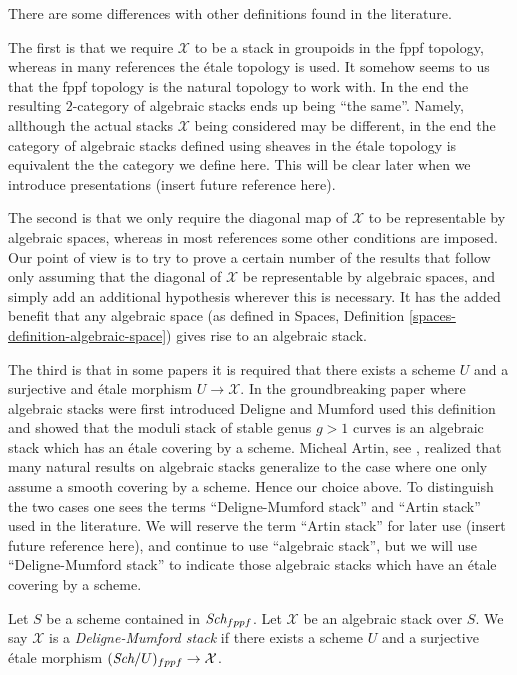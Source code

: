 \noindent
There are some differences with other definitions found in the literature.

\medskip\noindent
The first is that we require $\mathcal{X}$ to be a stack in groupoids
in the fppf topology, whereas in many references the \'etale topology is
used. It somehow seems to us that the fppf topology is the natural topology
to work with. In the end the resulting $2$-category of algebraic stacks
ends up being ``the same''. Namely, allthough the actual
stacks $\mathcal{X}$ being considered may be different, in the end the
category of algebraic stacks defined using sheaves in the \'etale topology
is equivalent the the category we define here. This will be clear later
when we introduce presentations (insert future reference here).

\medskip\noindent
The second is that we only require the diagonal map of $\mathcal{X}$ to be
representable by algebraic spaces, whereas in most references some other
conditions are imposed. Our point of view is to try to prove a certain
number of the results that follow only assuming that the diagonal
of $\mathcal{X}$ be representable by algebraic spaces, and simply add
an additional hypothesis wherever this is necessary. It has the added
benefit that any algebraic space (as defined in
Spaces, Definition \ref{spaces-definition-algebraic-space})
gives rise to an algebraic stack.

\medskip\noindent
The third is that in some papers it is required that there exists a
scheme $U$ and a surjective and \'etale morphism $U \to \mathcal{X}$.
In the groundbreaking paper \cite{DM} where algebraic stacks were first
introduced Deligne and Mumford used this definition and showed that
the moduli stack of stable genus $g > 1$ curves is an algebraic stack 
which has an \'etale covering by a scheme. Micheal Artin, see
\cite{artin_versal}, realized that many
natural results on algebraic stacks generalize to the case where one
only assume a smooth covering by a scheme. Hence our choice above.
To distinguish the two cases one sees the terms ``Deligne-Mumford stack''
and ``Artin stack'' used in the literature. We will reserve the term
``Artin stack'' for later use (insert future reference here), and continue
to use ``algebraic stack'', but we will use ``Deligne-Mumford stack''
to indicate those algebraic stacks which have an \'etale covering by a
scheme.

\begin{definition}
\label{definition-deligne-mumford}
Let $S$ be a scheme contained in $\textit{Sch}_{fppf}$.
Let $\mathcal{X}$ be an algebraic stack over $S$.
We say $\mathcal{X}$ is a {\it Deligne-Mumford stack} if there exists
a scheme $U$ and a surjective \'etale morphism
$(\textit{Sch}/U)_{fppf} \to \mathcal{X}$.
\end{definition}

